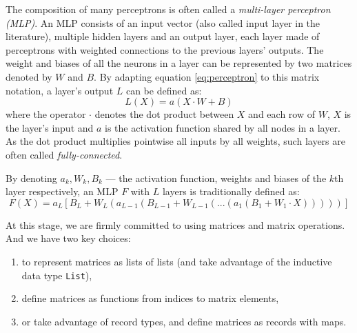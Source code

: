 \documentclass[runningheads]{llncs}
\begin{document}
The composition of many perceptrons is often called a \emph{multi-layer perceptron (MLP)}.
An MLP consists of an input vector (also called input layer in the literature),
multiple hidden layers and an output layer, each layer 
made of perceptrons with weighted connections to the previous layers' outputs. %
The weight and biases of all the neurons in a layer can be represented by two matrices denoted by $W$ and $B$. By adapting equation \ref{eq:perceptron} to this matrix notation, a layer's output $L$ can be defined as:
\begin{equation}
	L(X) = a(X \cdot W + B)
\end{equation}
where the operator $\cdot $ denotes the dot product between $X$ and each row of $W$, %
$X$ is the layer's input and $a$ is the activation function shared by all nodes in a layer. %
As the dot product multiplies pointwise all inputs by all weights, such layers are often called \emph{fully-connected}. %

By denoting $a_k, W_k, B_k$ --- the activation function, weights and biases of the $k$th layer respectively, an MLP $F$ with $L$ layers is traditionally defined as:
\begin{equation}
	F(X) = a_L[B_L + W_L (a_{L-1}(B_{L-1} + W_{L-1}(...(a_1(B_1+W_1\cdot X)))))]
      \end{equation}

      At this stage, we are firmly committed to using matrices and matrix operations. And we have two key choices:
\begin{enumerate}
\item to represent matrices as lists of lists (and take advantage of the inductive data type \lstinline{List}),
\item define matrices as functions from indices to matrix elements,
\item or take advantage of record types, and define matrices as records with maps.  
\end{enumerate}
\end{document}

